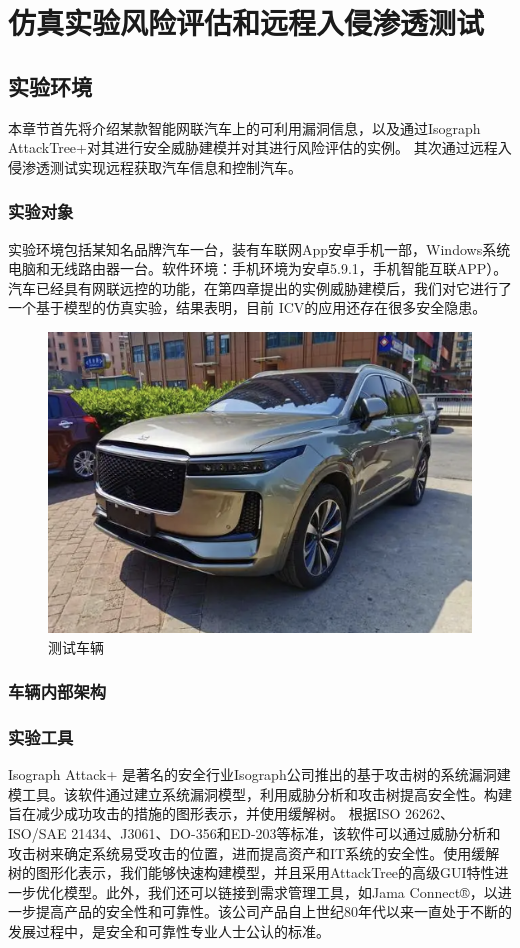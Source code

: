 \chapter{仿真实验风险评估和远程入侵渗透测试}
\label{ch5}
\section{实验环境}
本章节首先将介绍某款智能网联汽车上的可利用漏洞信息，以及通过Isograph AttackTree+对其进行安全威胁建模并对其进行风险评估的实例。
其次通过远程入侵渗透测试实现远程获取汽车信息和控制汽车。
\subsection{实验对象}
实验环境包括某知名品牌汽车一台，装有车联网App安卓手机一部，Windows系统电脑和无线路由器一台。软件环境：手机环境为安卓5.9.1，手机智能互联APP）。
汽车已经具有网联远控的功能，在第四章提出的实例威胁建模后，我们对它进行了一个基于模型的仿真实验，结果表明，目前 ICV的应用还存在很多安全隐患。

\begin{figure}
    \centering
    \includegraphics[scale=0.5]{resources/img/i14.png}
    \caption{测试车辆}
  \end{figure}
\subsection{车辆内部架构}
\subsection{实验工具}  

Isograph Attack+ 是著名的安全行业Isograph公司推出的基于攻击树的系统漏洞建模工具。该软件通过建立系统漏洞模型，利用威胁分析和攻击树提高安全性。构建旨在减少成功攻击的措施的图形表示，并使用缓解树。
根据ISO 26262、ISO/SAE 21434、J3061、DO-356和ED-203等标准，该软件可以通过威胁分析和攻击树来确定系统易受攻击的位置，进而提高资产和IT系统的安全性。使用缓解树的图形化表示，我们能够快速构建模型，并且采用AttackTree的高级GUI特性进一步优化模型。此外，我们还可以链接到需求管理工具，如Jama Connect®，以进一步提高产品的安全性和可靠性。该公司产品自上世纪80年代以来一直处于不断的发展过程中，是安全和可靠性专业人士公认的标准。

